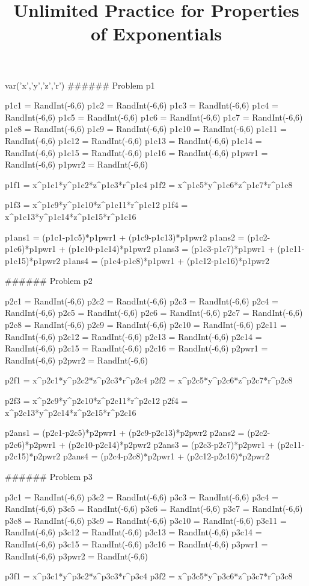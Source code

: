 \documentclass{ximeraXloud}
\title{Unlimited Practice for Properties of Exponentials}
\begin{document}


\begin{sagesilent}
var('x','y','z','r')
###### Problem p1

p1c1 = RandInt(-6,6)
p1c2 = RandInt(-6,6)
p1c3 = RandInt(-6,6)
p1c4 = RandInt(-6,6)
p1c5 = RandInt(-6,6)
p1c6 = RandInt(-6,6)
p1c7 = RandInt(-6,6)
p1c8 = RandInt(-6,6)
p1c9 = RandInt(-6,6)
p1c10 = RandInt(-6,6)
p1c11 = RandInt(-6,6)
p1c12 = RandInt(-6,6)
p1c13 = RandInt(-6,6)
p1c14 = RandInt(-6,6)
p1c15 = RandInt(-6,6)
p1c16 = RandInt(-6,6)
p1pwr1 = RandInt(-6,6)
p1pwr2 = RandInt(-6,6)

p1f1 = x^p1c1*y^p1c2*z^p1c3*r^p1c4
p1f2 = x^p1c5*y^p1c6*z^p1c7*r^p1c8

p1f3 = x^p1c9*y^p1c10*z^p1c11*r^p1c12
p1f4 = x^p1c13*y^p1c14*z^p1c15*r^p1c16

p1ans1 = (p1c1-p1c5)*p1pwr1 + (p1c9-p1c13)*p1pwr2
p1ans2 = (p1c2-p1c6)*p1pwr1 + (p1c10-p1c14)*p1pwr2
p1ans3 = (p1c3-p1c7)*p1pwr1 + (p1c11-p1c15)*p1pwr2
p1ans4 = (p1c4-p1c8)*p1pwr1 + (p1c12-p1c16)*p1pwr2


###### Problem p2

p2c1 = RandInt(-6,6)
p2c2 = RandInt(-6,6)
p2c3 = RandInt(-6,6)
p2c4 = RandInt(-6,6)
p2c5 = RandInt(-6,6)
p2c6 = RandInt(-6,6)
p2c7 = RandInt(-6,6)
p2c8 = RandInt(-6,6)
p2c9 = RandInt(-6,6)
p2c10 = RandInt(-6,6)
p2c11 = RandInt(-6,6)
p2c12 = RandInt(-6,6)
p2c13 = RandInt(-6,6)
p2c14 = RandInt(-6,6)
p2c15 = RandInt(-6,6)
p2c16 = RandInt(-6,6)
p2pwr1 = RandInt(-6,6)
p2pwr2 = RandInt(-6,6)

p2f1 = x^p2c1*y^p2c2*z^p2c3*r^p2c4
p2f2 = x^p2c5*y^p2c6*z^p2c7*r^p2c8

p2f3 = x^p2c9*y^p2c10*z^p2c11*r^p2c12
p2f4 = x^p2c13*y^p2c14*z^p2c15*r^p2c16

p2ans1 = (p2c1-p2c5)*p2pwr1 + (p2c9-p2c13)*p2pwr2
p2ans2 = (p2c2-p2c6)*p2pwr1 + (p2c10-p2c14)*p2pwr2
p2ans3 = (p2c3-p2c7)*p2pwr1 + (p2c11-p2c15)*p2pwr2
p2ans4 = (p2c4-p2c8)*p2pwr1 + (p2c12-p2c16)*p2pwr2


###### Problem p3

p3c1 = RandInt(-6,6)
p3c2 = RandInt(-6,6)
p3c3 = RandInt(-6,6)
p3c4 = RandInt(-6,6)
p3c5 = RandInt(-6,6)
p3c6 = RandInt(-6,6)
p3c7 = RandInt(-6,6)
p3c8 = RandInt(-6,6)
p3c9 = RandInt(-6,6)
p3c10 = RandInt(-6,6)
p3c11 = RandInt(-6,6)
p3c12 = RandInt(-6,6)
p3c13 = RandInt(-6,6)
p3c14 = RandInt(-6,6)
p3c15 = RandInt(-6,6)
p3c16 = RandInt(-6,6)
p3pwr1 = RandInt(-6,6)
p3pwr2 = RandInt(-6,6)

p3f1 = x^p3c1*y^p3c2*z^p3c3*r^p3c4
p3f2 = x^p3c5*y^p3c6*z^p3c7*r^p3c8


\end{sagesilent}
\end{document}
